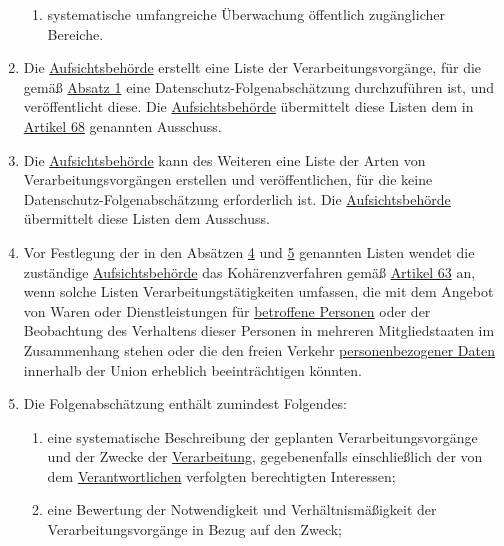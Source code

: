 \begin{enumerate}
\begin{enumerate}
    \item systematische umfangreiche Überwachung öffentlich zugänglicher Bereiche.%
    \label{itm:35-3c}

  \end{enumerate}

  \item Die \hyperref[itm:04-21]{Aufsichtsbehörde} erstellt eine Liste der Verarbeitungsvorgänge, für die
   gemäß \hyperref[itm:35-1]{Absatz 1} eine Datenschutz-Folgenabschätzung durchzuführen ist, und veröffentlicht diese.
   Die \hyperref[itm:04-21]{Aufsichtsbehörde} übermittelt diese Listen dem in \hyperref[ch:68]{Artikel 68} genannten
   Ausschuss.%
  \label{itm:35-4}

  \item Die \hyperref[itm:04-21]{Aufsichtsbehörde} kann des Weiteren eine Liste der Arten von Verarbeitungsvorgängen
   erstellen und veröffentlichen, für die keine Datenschutz-Folgenabschätzung erforderlich ist. Die \hyperref
   [itm:04-21]{Aufsichtsbehörde} übermittelt diese Listen dem Ausschuss.%
  \label{itm:35-5}

  \item Vor Festlegung der in den Absätzen \hyperref[itm:35-4]{4} und \hyperref[itm:35-5]{5} genannten Listen wendet die
   zuständige \hyperref[itm:04-21]{Aufsichtsbehörde} das Kohärenzverfahren gemäß \hyperref[ch:63]{Artikel 63} an, wenn
   solche Listen Verarbeitungstätigkeiten umfassen, die mit dem Angebot von Waren oder Dienstleistungen für \hyperref
   [itm:04-1]{betroffene Personen} oder der Beobachtung des Verhaltens dieser Personen in mehreren Mitgliedstaaten im
   Zusammenhang stehen oder die den freien Verkehr \hyperref[itm:04-1]{personenbezogener Daten} innerhalb der Union
   erheblich beeinträchtigen könnten.%
  \label{itm:35-6}

  \item Die Folgenabschätzung enthält zumindest Folgendes:%
  \label{itm:35-7}

  \begin{enumerate}
  
    \item eine systematische Beschreibung der geplanten Verarbeitungsvorgänge und der Zwecke der \hyperref[itm:04-2]
     {Verarbeitung}, gegebenenfalls einschließlich der von dem \hyperref[itm:04-7]{Verantwortlichen} verfolgten
     berechtigten Interessen;%
    \label{itm:35-7a}

    \item eine Bewertung der Notwendigkeit und Verhältnismäßigkeit der Verarbeitungsvorgänge in Bezug auf den Zweck;%
    \label{itm:35-7b}


\end{enumerate}
\end{enumerate}
